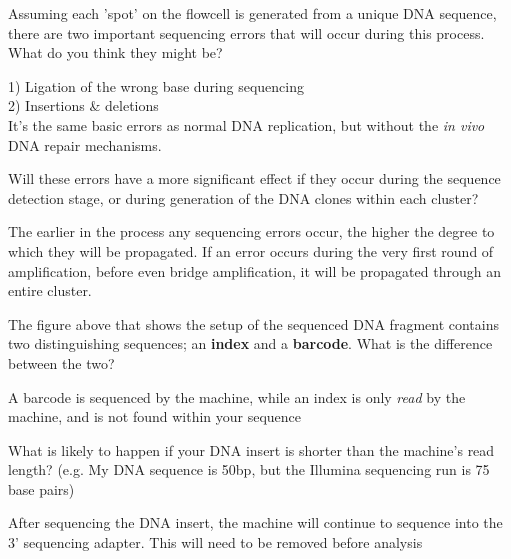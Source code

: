\begin{questions}
Assuming each 'spot' on the flowcell is generated from a unique DNA sequence, there are two important sequencing errors that will occur during this process.
What do you think they might be? \\
\begin{answer}
1) Ligation of the wrong base during sequencing \\
2) Insertions \& deletions \\
It's the same basic errors as normal DNA replication, but without the \textit{in vivo} DNA repair mechanisms.
\end{answer}

Will these errors have a more significant effect if they occur during the sequence detection stage, or during generation of the DNA clones within each cluster? \\
\begin{answer}
The earlier in the process any sequencing errors occur, the higher the degree to which they will be propagated.
If an error occurs during the very first round of amplification, before even bridge amplification, it will be propagated through an entire cluster. \\
\end{answer}

The figure above that shows the setup of the sequenced DNA fragment contains two distinguishing sequences; an \textbf{index} and a \textbf{barcode}. What is the difference between the two? \\
\begin{answer}
A barcode is sequenced by the machine, while an index is only \textit{read} by the machine, and is not found within your sequence
\end{answer}

What is likely to happen if your DNA insert is shorter than the machine's read length? (e.g. My DNA sequence is 50bp, but the Illumina sequencing run is 75 base pairs) \\
\begin{answer}
After sequencing the DNA insert, the machine will continue to sequence into the 3' sequencing adapter. This will need to be removed before analysis
\end{answer}
\end{questions}


